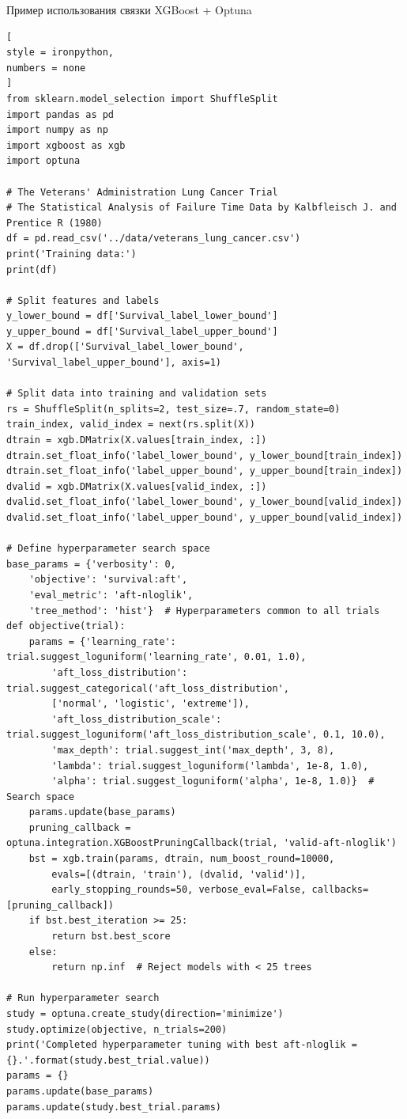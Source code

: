 \documentclass[%
	11pt,
	a4paper,
	utf8,
		]{article}
\begin{document}
Пример использования связки XGBoost + Optuna
\begin{lstlisting}[
style = ironpython,
numbers = none
]
from sklearn.model_selection import ShuffleSplit
import pandas as pd
import numpy as np
import xgboost as xgb
import optuna

# The Veterans' Administration Lung Cancer Trial
# The Statistical Analysis of Failure Time Data by Kalbfleisch J. and Prentice R (1980)
df = pd.read_csv('../data/veterans_lung_cancer.csv')
print('Training data:')
print(df)

# Split features and labels
y_lower_bound = df['Survival_label_lower_bound']
y_upper_bound = df['Survival_label_upper_bound']
X = df.drop(['Survival_label_lower_bound', 'Survival_label_upper_bound'], axis=1)

# Split data into training and validation sets
rs = ShuffleSplit(n_splits=2, test_size=.7, random_state=0)
train_index, valid_index = next(rs.split(X))
dtrain = xgb.DMatrix(X.values[train_index, :])
dtrain.set_float_info('label_lower_bound', y_lower_bound[train_index])
dtrain.set_float_info('label_upper_bound', y_upper_bound[train_index])
dvalid = xgb.DMatrix(X.values[valid_index, :])
dvalid.set_float_info('label_lower_bound', y_lower_bound[valid_index])
dvalid.set_float_info('label_upper_bound', y_upper_bound[valid_index])

# Define hyperparameter search space
base_params = {'verbosity': 0,
	'objective': 'survival:aft',
	'eval_metric': 'aft-nloglik',
	'tree_method': 'hist'}  # Hyperparameters common to all trials
def objective(trial):
	params = {'learning_rate': trial.suggest_loguniform('learning_rate', 0.01, 1.0),
		'aft_loss_distribution': trial.suggest_categorical('aft_loss_distribution',
		['normal', 'logistic', 'extreme']),
		'aft_loss_distribution_scale': trial.suggest_loguniform('aft_loss_distribution_scale', 0.1, 10.0),
		'max_depth': trial.suggest_int('max_depth', 3, 8),
		'lambda': trial.suggest_loguniform('lambda', 1e-8, 1.0),
		'alpha': trial.suggest_loguniform('alpha', 1e-8, 1.0)}  # Search space
	params.update(base_params)
	pruning_callback = optuna.integration.XGBoostPruningCallback(trial, 'valid-aft-nloglik')
	bst = xgb.train(params, dtrain, num_boost_round=10000,
		evals=[(dtrain, 'train'), (dvalid, 'valid')],
		early_stopping_rounds=50, verbose_eval=False, callbacks=[pruning_callback])
	if bst.best_iteration >= 25:
		return bst.best_score
	else:
		return np.inf  # Reject models with < 25 trees

# Run hyperparameter search
study = optuna.create_study(direction='minimize')
study.optimize(objective, n_trials=200)
print('Completed hyperparameter tuning with best aft-nloglik = {}.'.format(study.best_trial.value))
params = {}
params.update(base_params)
params.update(study.best_trial.params)


\end{lstlisting}
\end{document}

